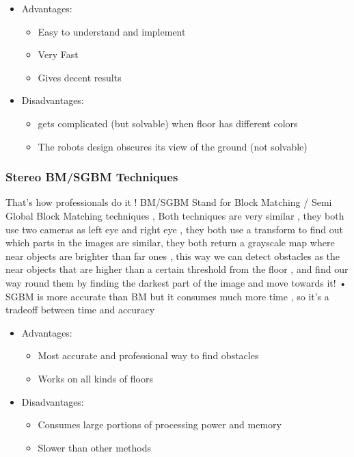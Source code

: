\documentclass[12pt]{article}
\begin{document}
\begin{itemize}
	\item Advantages:
	\begin{itemize}
		\item Easy to understand and implement 
		\item Very Fast
		\item Gives decent results
		
	\end{itemize}
	\item Disadvantages:
	\begin{itemize}
		\item gets complicated (but solvable) when floor has different colors 
		\item The robots design obscures its view of the ground (not solvable)
		
	\end{itemize}
\end{itemize}

\subsubsection{Stereo BM/SGBM Techniques}
That’s how professionals do it ! BM/SGBM Stand for Block Matching / Semi Global Block Matching techniques , Both techniques are very similar , they both use two cameras as left eye and right eye , they both use a transform to find out which parts in the images are similar, they both return a grayscale map where near objects are brighter than far ones , this way we can detect obstacles as the near objects that are higher than a certain threshold from the floor , and find our way round them by finding the darkest part of the image and move towards it!
•	SGBM is more accurate than BM but it consumes much more time , so it’s a tradeoff between time and accuracy

\begin{itemize}
	\item Advantages:
	\begin{itemize}
		\item Most accurate and professional way to find obstacles
		\item Works on all kinds of floors
	\end{itemize}
	\item Disadvantages:
	\begin{itemize}
		\item Consumes large portions of processing power and memory
		\item Slower than other methods
	\end{itemize}
\end{itemize}
\end{document}
